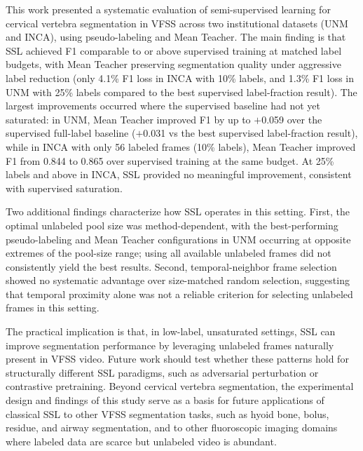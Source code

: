 \documentclass[
  msc,
  american
]{ThesisPUC_v2}
\begin{document}
This work presented a systematic evaluation of semi-supervised learning for cervical vertebra segmentation in VFSS across two institutional datasets (UNM and INCA), using pseudo-labeling and Mean Teacher. The main finding is that SSL achieved F1 comparable to or above supervised training at matched label budgets, with Mean Teacher preserving segmentation quality under aggressive label reduction (only 4.1\% F1 loss in INCA with 10\% labels, and 1.3\% F1 loss in UNM with 25\% labels compared to the best supervised label-fraction result). The largest improvements occurred where the supervised baseline had not yet saturated: in UNM, Mean Teacher improved F1 by up to $+$0.059 over the supervised full-label baseline ($+$0.031 vs the best supervised label-fraction result), while in INCA with only 56 labeled frames (10\% labels), Mean Teacher improved F1 from 0.844 to 0.865 over supervised training at the same budget. At 25\% labels and above in INCA, SSL provided no meaningful improvement, consistent with supervised saturation.

Two additional findings characterize how SSL operates in this setting. First, the optimal unlabeled pool size was method-dependent, with the best-performing pseudo-labeling and Mean Teacher configurations in UNM occurring at opposite extremes of the pool-size range; using all available unlabeled frames did not consistently yield the best results. Second, temporal-neighbor frame selection showed no systematic advantage over size-matched random selection, suggesting that temporal proximity alone was not a reliable criterion for selecting unlabeled frames in this setting.

The practical implication is that, in low-label, unsaturated settings, SSL can improve segmentation performance by leveraging unlabeled frames naturally present in VFSS video. Future work should test whether these patterns hold for structurally different SSL paradigms, such as adversarial perturbation or contrastive pretraining. Beyond cervical vertebra segmentation, the experimental design and findings of this study serve as a basis for future applications of classical SSL to other VFSS segmentation tasks, such as hyoid bone, bolus, residue, and airway segmentation, and to other fluoroscopic imaging domains where labeled data are scarce but unlabeled video is abundant.


\end{document}
